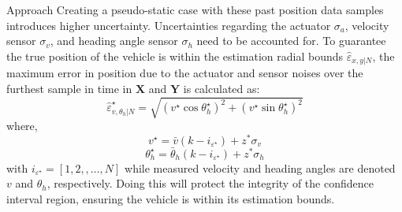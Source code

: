 \begin{section}{Approach}
Creating a pseudo-static case with these past position data samples introduces higher uncertainty. Uncertainties regarding the actuator $\sigma_a$, velocity sensor $\sigma_v$, and heading angle sensor $\sigma_h$ need to be accounted for. To guarantee the true position of the vehicle is within the estimation radial bounds $\hat{\varepsilon}_{x,y|N}$, the maximum error in position due to the actuator and sensor noises over the furthest sample in time in $\mathcal{\bm{X}}$ and $\mathcal{\bm{Y}}$ is calculated as:
    \begin{equation}
	\hat{\varepsilon}_{v,\theta_h|N}^{\star}=\sqrt{(v^{\star}\cos{\theta_h^{\star}})^2+(v^{\star}\sin{\theta_h^{\star}})^2}
	\end{equation}
where,
    \begin{equation}
	v^{\star}=\bar{v}(k-i_{\varepsilon^{\star}})+z^{*}\sigma_v \nonumber
	\end{equation}
	\begin{equation}
	\theta_h^{\star}=\bar{\theta}_h(k-i_{\varepsilon^{\star}})+z^{*}\sigma_h \nonumber
	\end{equation}
with $i_{\varepsilon^{\star}}=[1,2,,\dots,N]$ while measured velocity and heading angles are denoted $v$ and $\theta_h$, respectively. Doing this will protect the integrity of the confidence interval region, ensuring the vehicle is within its estimation bounds.


\end{section}
